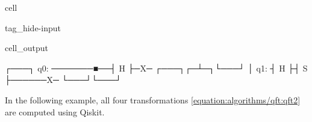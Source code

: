 \documentclass[letterpaper,10pt,english]{jupyterBook}
\begin{document}
\begin{sphinxuseclass}{cell}
\begin{sphinxuseclass}{tag_hide-input}\begin{sphinxVerbatimOutput}

\begin{sphinxuseclass}{cell_output}
\begin{sphinxVerbatim}[commandchars=\\\{\}]
               ┌───┐
q\PYGZus{}0: ───────■──┤ H ├─X─
     ┌───┐┌─┴─┐└───┘ │
q\PYGZus{}1: ┤ H ├┤ S ├──────X─
     └───┘└───┘
\end{sphinxVerbatim}

\end{sphinxuseclass}\end{sphinxVerbatimOutput}

\end{sphinxuseclass}
\end{sphinxuseclass}
\sphinxAtStartPar
In the following example, all four transformations \eqref{equation:algorithms/qft:qft2} are computed using Qiskit.
\end{document}
